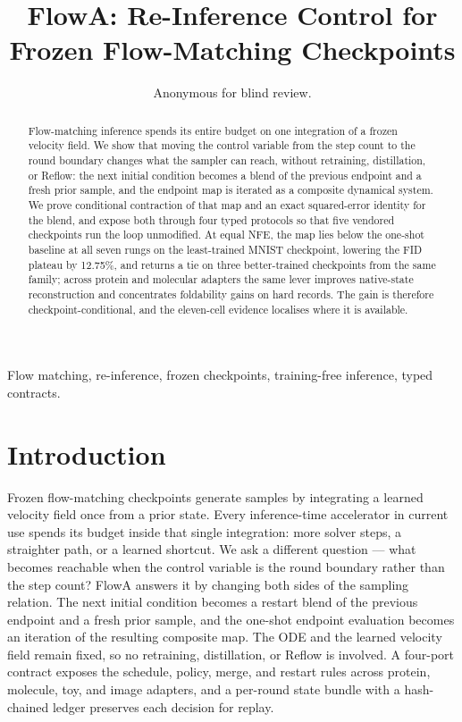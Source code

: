 \documentclass[journal,twocolumn,final]{IEEEtran}
\title{FlowA: Re-Inference Control for Frozen Flow-Matching Checkpoints}
\author{Anonymous for blind review.}
\begin{document}
\maketitle

\begin{abstract}
Flow-matching inference spends its entire budget on one integration of a frozen velocity field. We show that moving the control variable from the step count to the round boundary changes what the sampler can reach, without retraining, distillation, or Reflow: the next initial condition becomes a blend of the previous endpoint and a fresh prior sample, and the endpoint map is iterated as a composite dynamical system. We prove conditional contraction of that map and an exact squared-error identity for the blend, and expose both through four typed protocols so that five vendored checkpoints run the loop unmodified. At equal NFE, the map lies below the one-shot baseline at all seven rungs on the least-trained MNIST checkpoint, lowering the FID plateau by 12.75\%, and returns a tie on three better-trained checkpoints from the same family; across protein and molecular adapters the same lever improves native-state reconstruction and concentrates foldability gains on hard records. The gain is therefore checkpoint-conditional, and the eleven-cell evidence localises where it is available.
\end{abstract}
\begin{IEEEkeywords}
Flow matching, re-inference, frozen checkpoints, training-free inference, typed contracts.
\end{IEEEkeywords}

\section{Introduction}
Frozen flow-matching checkpoints generate samples by integrating a learned velocity field once from a prior state. Every inference-time accelerator in current use spends its budget inside that single integration: more solver steps, a straighter path, or a learned shortcut. We ask a different question --- what becomes reachable when the control variable is the round boundary rather than the step count? FlowA answers it by changing both sides of the sampling relation. The next initial condition becomes a restart blend of the previous endpoint and a fresh prior sample, and the one-shot endpoint evaluation becomes an iteration of the resulting composite map. The ODE and the learned velocity field remain fixed, so no retraining, distillation, or Reflow is involved. A four-port contract exposes the schedule, policy, merge, and restart rules across protein, molecule, toy, and image adapters, and a per-round state bundle with a hash-chained ledger preserves each decision for replay.
\end{document}
